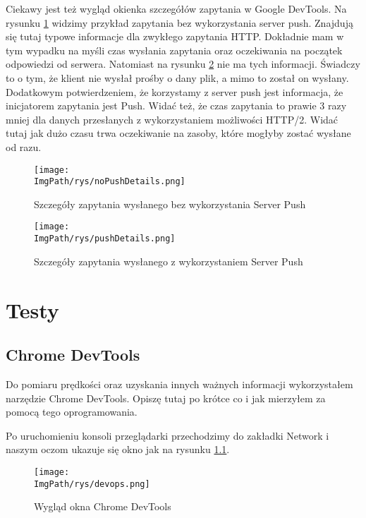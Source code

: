 \documentclass[a4paper,12pt,twoside,openany]{report}
\newcommand{\ImgPath}{.}
\begin{document}
Ciekawy jest też wygląd okienka szczegółów zapytania w Google DevTools.
Na rysunku \ref{schematNoPushDetails} widzimy przykład zapytania bez wykorzystania server push.
Znajdują się tutaj typowe informacje dla zwykłego zapytania HTTP.
Dokładnie mam w tym wypadku na myśli czas wysłania zapytania oraz oczekiwania na początek odpowiedzi od serwera.
Natomiast na rysunku \ref{schematPushDetails} nie ma tych informacji.
Świadczy to o tym, że klient nie wysłał prośby o dany plik, a mimo to został on wysłany.
Dodatkowym potwierdzeniem, że korzystamy z server push jest informacja, że inicjatorem zapytania jest Push.
Widać też, że czas zapytania to prawie 3 razy mniej dla danych przesłanych z wykorzystaniem możliwości HTTP/2.
Widać tutaj jak dużo czasu trwa oczekiwanie na zasoby, które mogłyby zostać wysłane od razu.

\begin{figure}[!htbp]
	\begin{center}
\centering
\texttt{[image: \\ImgPath/rys/noPushDetails.png]}
\end{center}
	\caption{Szczegóły zapytania wysłanego bez wykorzystania Server Push}
	\label{schematNoPushDetails}
\end{figure}

\begin{figure}[!htbp]
	\begin{center}
\centering
\texttt{[image: \\ImgPath/rys/pushDetails.png]}
\end{center}
	\caption{Szczegóły zapytania wysłanego z wykorzystaniem Server Push}
	\label{schematPushDetails}
\end{figure}

\chapter{Testy}

\section{Chrome DevTools}

Do pomiaru prędkości oraz uzyskania innych ważnych informacji wykorzystałem narzędzie Chrome DevTools.
Opiszę tutaj po krótce co i jak mierzyłem za pomocą tego oprogramowania.

Po uruchomieniu konsoli przeglądarki przechodzimy do zakładki Network i naszym oczom ukazuje się okno jak na rysunku \ref{schematDevops}.

\begin{figure}[!htbp]
	\begin{center}
\centering
\texttt{[image: \\ImgPath/rys/devops.png]}
\end{center}
	\caption{Wygląd okna Chrome DevTools}
	\label{schematDevops}
\end{figure}
\end{document}
